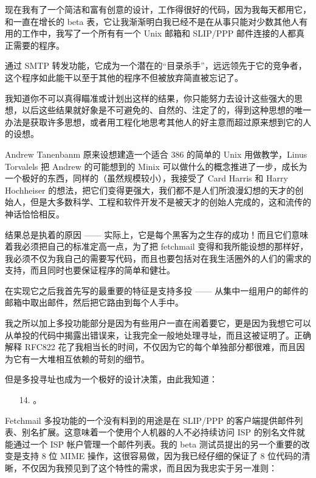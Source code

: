 现在我有了一个简洁和富有创意的设计，工作得很好的代码，因为我每天都用它，和一直在增长的 beta 表，它让我渐渐明白我已经不是在从事只能对少数其他人有用的工作中，我写了一个所有有一个 Unix 邮箱和 SLIP/PPP 邮件连接的人都真正需要的程序。


通过 SMTP 转发功能，它成为一个潜在的“目录杀手”，远远领先于它的竞争者，这个程序如此能干以至于其他的程序不但被放弃简直被忘记了。


我知道你不可以真得瞄准或计划出这样的结果，你只能努力去设计这些强大的思想，以后这些结果就好象是不可避免的、自然的、注定了的，得到这种思想的唯一办法是获取许多思想，或者用工程化地思考其他人的好主意而超过原来想到它的人的设想。


Andrew Tanenbanm 原来设想建造一个适合 386 的简单的 Unix 用做教学，Linus Torvalels 把 Andrew 的可能想到的 Minix 可以做什么的概念推进了一步，成长为一个极好的东西，同样的（虽然规模较小），我接受了 Card Harris 和 Harry Hochheiser 的想法，把它们变得更强大，我们都不是人们所浪漫幻想的天才的创始人，但是大多数科学、工程和软件开发不是被天才的创始人完成的，这和流传的神话恰恰相反。


结果总是执着的原因 —— 实际上，它是每个黑客为之生存的成功！而且它们意味着我必须把自己的标准定高一点，为了把 fetchmail 变得和我所能设想的那样好，我必须不仅为我自己的需要写代码，而且也要包括对在我生活圈外的人们的需求的支持，而且同时也要保证程序的简单和健壮。

在实现它之后我首先写的最重要的特征是支持多投 —— 从集中一组用户的邮件的邮箱中取出邮件，然后把它路由到每个人手中。


我之所以加上多投功能部分是因为有些用户一直在闹着要它，更是因为我想它可以从单投的代码中揭露出错误来，让我完全一般地处理寻址，而且这被证明了。正确解释 RFC822 花了我相当长的时间，不仅因为它的每个单独部分都很难，而且因为它有一大堆相互依赖的苛刻的细节。


但是多投寻址也成为一个极好的设计决策，由此我知道：

\begin{enumerate}
\item[14.] 。
\end{enumerate}

Fetchmail 多投功能的一个没有料到的用途是在 SLIP/PPP 的客户端提供邮件列表、别名扩展。这意味着一个使用个人机器的人不必持续访问 ISP 的别名文件就能通过一个 ISP 帐户管理一个邮件列表。我的 beta 测试员提出的另一个重要的改变是支持 8 位 MIME 操作，这很容易做，因为我已经仔细的保证了 8 位代码的清晰，不仅因为我预见到了这个特性的需求，而且因为我忠实于另一准则：

